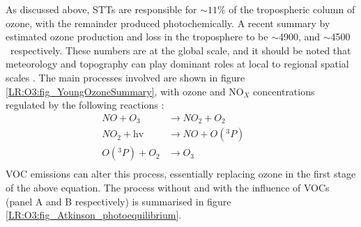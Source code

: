     As discussed above, STTs are responsible for $\sim 11\%$ of the 
    tropospheric column of ozone, with the remainder produced photochemically.
    A recent summary by \textcite{Young2018} estimated ozone production and 
    loss in the troposphere to be $\sim$4900\tgpyr, and $\sim$4500\tgpyr 
    ~respectively. 
    These numbers are at the global scale,  and it should be noted that 
    meteorology and topography can play dominant roles at local to regional 
    spatial scales \parencite[e.g.,][]{Kuang2017}.
    The main processes involved are shown in figure 
    \ref{LR:O3:fig_YoungOzoneSummary}, with ozone and NO$_X$ concentrations 
    regulated by the following reactions \parencite{Sillman1999,Atkinson2000}:
    \begin{equation}
    \begin{aligned}
    NO + O_3         & \to NO_2 + O_2      && \\%
    NO_2 + \text{hv} & \to NO + O({}^3P)   && \\%
    O({}^3P) + O_2   & \to O_3 			 && \\%
    \end{aligned}
    \label{LR:Atmos:Chem:eqn_NOandO3}
    \end{equation}
    VOC emissions can alter this process, essentially replacing ozone in the 
    first stage of the above equation.
    The process without and with the influence of VOCs (panel A and B 
    respectively) is summarised in figure 
    \ref{LR:O3:fig_Atkinson_photoequilibrium}.

    

